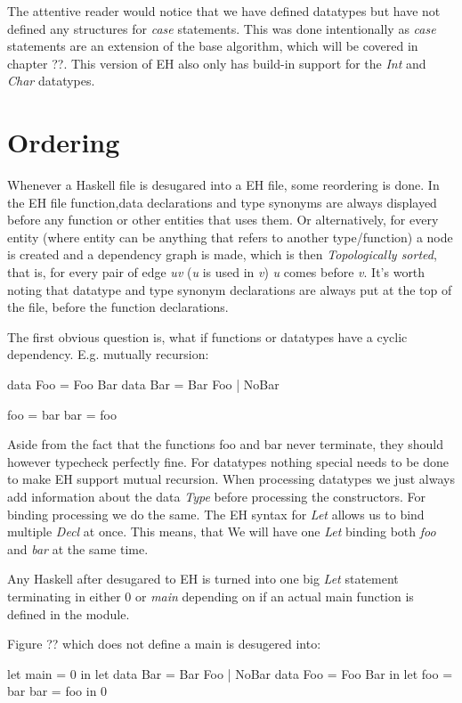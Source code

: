 The attentive reader would notice that we have defined datatypes but have not defined any structures for \emph{case} statements. This was done intentionally as \emph{case} statements are an extension of the base algorithm, which will be covered in chapter ??. This version of EH also only has build-in support for the \emph{Int} and \emph{Char} datatypes.

\section{Ordering}
Whenever a Haskell file is desugared into a EH file, some reordering is done. In the EH file function,data declarations and type synonyms are always displayed before any function or other entities that uses them. Or alternatively, for every entity (where entity can be anything that refers to another type/function) a node is created and a dependency graph is made, which is then \emph{Topologically sorted}, that is, for every pair of edge \emph{uv} (\emph{u} is used in \emph{v}) \emph{u} comes before \emph{v}. It's worth noting that datatype and type synonym declarations are always put at the top of the file, before the function declarations.

The first obvious question is, what if functions or datatypes have a cyclic dependency. E.g. mutually recursion:

\begin{code}
data Foo = Foo Bar
data Bar = Bar Foo | NoBar

foo = bar
bar = foo
\end{code}

Aside from the fact that the functions foo and bar never terminate, they should however typecheck perfectly fine. For datatypes nothing special needs to be done to make EH support mutual recursion. When processing datatypes we just always add information about the data \emph{Type} before processing the constructors. For binding processing we do the same. The EH syntax for \emph{Let} allows us to bind multiple \emph{Decl} at once. This means, that We will have one \emph{Let} binding both \emph{foo} and \emph{bar} at the same time.

Any Haskell after desugared to EH is turned into one big \emph{Let} statement terminating in either 0 or \emph{main} depending on if an actual main function is defined in the module.

Figure ?? which does not define a main is desugered into:

\begin{code}
let main = 0
in let data Bar  = Bar Foo | NoBar
       data Foo  = Foo Bar
   in let foo = bar
          bar = foo
      in 0
\end{code}

